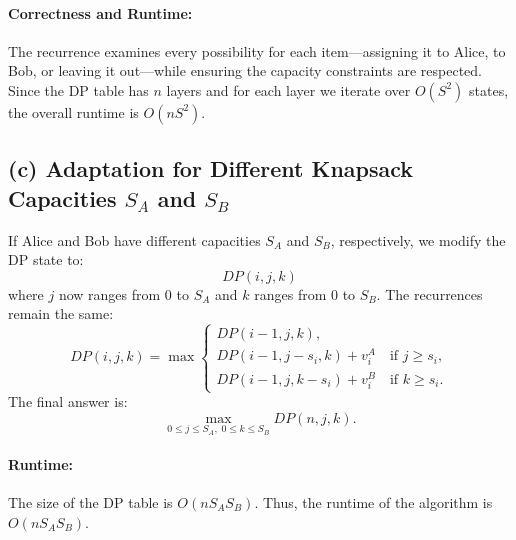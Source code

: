 \documentclass[11pt]{article}
\begin{document}
    \paragraph{Correctness and Runtime:}
    The recurrence examines every possibility for each item—assigning it to Alice, to Bob, or leaving it out—while ensuring the capacity constraints are respected. Since the DP table has \(n\) layers and for each layer we iterate over \(O(S^2)\) states, the overall runtime is \(O(nS^2)\).
    
    \subsection*{(c) Adaptation for Different Knapsack Capacities \(S_A\) and \(S_B\)}
    If Alice and Bob have different capacities \(S_A\) and \(S_B\), respectively, we modify the DP state to:
    \[
    DP(i,j,k)
    \]
    where \(j\) now ranges from \(0\) to \(S_A\) and \(k\) ranges from \(0\) to \(S_B\). The recurrences remain the same:
    \[
    DP(i,j,k) = \max \begin{cases}
    DP(i-1, j, k), \\[1mm]
    DP(i-1, j-s_i, k) + v_i^A \quad \text{if } j \ge s_i, \\[1mm]
    DP(i-1, j, k-s_i) + v_i^B \quad \text{if } k \ge s_i.
    \end{cases}
    \]
    The final answer is:
    \[
    \max_{0\le j\le S_A,\;0\le k\le S_B} DP(n,j,k).
    \]
    
    \paragraph{Runtime:}
    The size of the DP table is \(O(nS_A S_B)\). Thus, the runtime of the algorithm is \(O(nS_A S_B)\).
    

    \newpage
\end{document}

